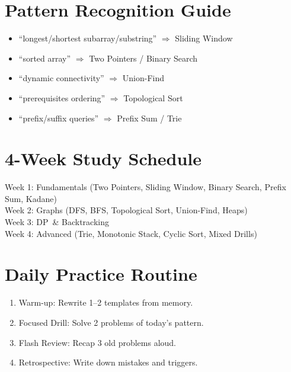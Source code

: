 \documentclass[11pt]{article}
\begin{document}
\section{Pattern Recognition Guide}
\begin{tcolorbox}[colback=codebg,colframe=black!60,title=Trigger Words]
  \begin{itemize}[leftmargin=1.2em]
    \item ``longest/shortest subarray/substring'' $\Rightarrow$ Sliding Window
    \item ``sorted array'' $\Rightarrow$ Two Pointers / Binary Search
    \item ``dynamic connectivity'' $\Rightarrow$ Union-Find
    \item ``prerequisites ordering'' $\Rightarrow$ Topological Sort
    \item ``prefix/suffix queries'' $\Rightarrow$ Prefix Sum / Trie
  \end{itemize}
\end{tcolorbox}

\section{4-Week Study Schedule}
\begin{tcolorbox}[colback=codebg,colframe=black!60,title=Overview]
  Week 1: Fundamentals (Two Pointers, Sliding Window, Binary Search, Prefix Sum, Kadane) \\
  Week 2: Graphs (DFS, BFS, Topological Sort, Union-Find, Heaps) \\
  Week 3: DP \,\& Backtracking \\
  Week 4: Advanced (Trie, Monotonic Stack, Cyclic Sort, Mixed Drills)
\end{tcolorbox}

\section{Daily Practice Routine}
\begin{tcolorbox}[colback=codebg,colframe=black!60,title=45--90 Minutes]
  \begin{enumerate}[leftmargin=1.2em]
    \item Warm-up: Rewrite 1--2 templates from memory.
    \item Focused Drill: Solve 2 problems of today’s pattern.
    \item Flash Review: Recap 3 old problems aloud.
    \item Retrospective: Write down mistakes and triggers.
  \end{enumerate}
\end{tcolorbox}
\end{document}
